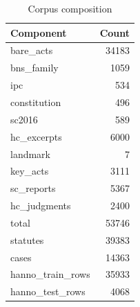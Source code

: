 \begin{table}
\caption{Corpus composition}
\label{tab:corpus}
\begin{tabular}{lr}
\toprule
Component & Count \\
\midrule
bare\_acts & 34183 \\
bns\_family & 1059 \\
ipc & 534 \\
constitution & 496 \\
sc2016 & 589 \\
hc\_excerpts & 6000 \\
landmark & 7 \\
key\_acts & 3111 \\
sc\_reports & 5367 \\
hc\_judgments & 2400 \\
total & 53746 \\
statutes & 39383 \\
cases & 14363 \\
hanno\_train\_rows & 35933 \\
hanno\_test\_rows & 4068 \\
\bottomrule
\end{tabular}
\end{table}
